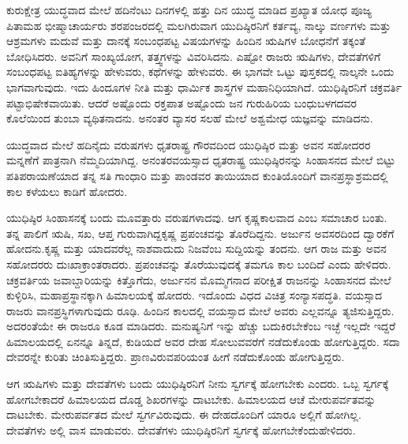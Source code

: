 \vskip 0.2cm

ಕುರುಕ್ಷೇತ್ರ ಯುದ್ಧವಾದ ಮೇಲೆ ಹದಿನೆಂಟು ದಿನಗಳಲ್ಲಿ ಹತ್ತು ದಿನ ಯುದ್ಧ ಮಾಡಿದ ಪ್ರಖ್ಯಾತ ಯೋಧ ಪೂಜ್ಯ ಪಿತಾಮಹ ಭೀಷ್ಮಾಚಾರ್ಯರು ಶರಪಂಜರದಲ್ಲಿ ಮಲಗಿರುವಾಗ ಯುದಿಷ್ಠಿರನಿಗೆ ಕರ್ತವ್ಯ, ನಾಲ್ಕು ವರ್ಣಗಳು ಮತ್ತು ಆಶ್ರಮಗಳು ಮದುವೆ ಮತ್ತು ದಾನಕ್ಕೆ ಸಂಬಂಧಪಟ್ಟ ವಿಷಯಗಳನ್ನು ಹಿಂದಿನ ಋಷಿಗಳ ಬೋಧನೆಗೆ ತಕ್ಕಂತೆ ಬೋಧಿಸಿದರು. ಅವನಿಗೆ ಸಾಂಖ್ಯಯೋಗ, ತತ್ತ್ವಗಳನ್ನು ವಿವರಿಸಿದನು. ಎಷ್ಟೋ ರಾಜರು ಋಷಿಗಳು, ದೇವತೆಗಳಿಗೆ ಸಂಬಂಧಪಟ್ಟ ಐತಿಹ್ಯಗಳನ್ನು ಹೇಳುವರು, ಕಥೆಗಳನ್ನು ಹೇಳುವರು. ಈ ಭಾಗವೇ ಒಟ್ಟು ಪುಸ್ತಕದಲ್ಲಿ ನಾಲ್ಕನೇ ಒಂದು ಭಾಗವಾಗುವುದು. ಇದು ಹಿಂದೂಗಳ ನೀತಿ ಮತ್ತು ಧಾರ್ಮಿಕ ಶಾಸ್ತ್ರಗಳ ಮಹಾನಿಧಿಯಾಗಿದೆ. ಯುಧಿಷ್ಠಿರನಿಗೆ ಚಕ್ರವರ್ತಿ ಪಟ್ಟಾಭಿಷೇಕವಾಯಿತು. ಆದರೆ ಅಷ್ಟೊಂದು ರಕ್ತಪಾತ ಅಷ್ಟೊಂದು ಜನ ಗುರುಹಿರಿಯ ಬಂಧುಬಳಗದವರ ಕೊಲೆಯಿಂದ ತುಂಬಾ ವ್ಯಥಿತನಾದನು. ಅನಂತರ ವ್ಯಾಸರ ಸಲಹೆ ಮೇಲೆ ಅಶ್ವಮೇಧ ಯಜ್ಞವನ್ನು ಮಾಡಿದನು.

\vskip 0.1cm

ಯುದ್ಧವಾದ ಮೇಲೆ ಹದಿನೈದು ವರುಷಗಳು ಧೃತರಾಷ್ಟ್ರ ಗೌರವದಿಂದ ಯುಧಿಷ್ಠಿರ ಮತ್ತು ಅವನ ಸಹೋದರರ ಮನ್ನಣೆಗೆ ಪಾತ್ರನಾಗಿ ನೆಮ್ಮದಿಯಾಗಿದ್ದ. ಅನಂತರ\break ವಯಸ್ಸಾದ ಧೃತರಾಷ್ಟ್ರ ಯುಧಿಷ್ಠಿರನನ್ನು ಸಿಂಹಾಸನದ ಮೇಲೆ ಬಿಟ್ಟು ಪತಿಪರಾಯಣೆಯಾದ ತನ್ನ ಸತಿ ಗಾಂಧಾರಿ ಮತ್ತು ಪಾಂಡವರ ತಾಯಿಯಾದ ಕುಂತಿಯೊಂದಿಗೆ ವಾನಪ್ರಸ್ಥಾಶ್ರಮದಲ್ಲಿ ಕಾಲ ಕಳೆಯಲು ಕಾಡಿಗೆ ಹೋದರು.

\vskip 0.1cm

ಯುಧಿಷ್ಠಿರ ಸಿಂಹಾಸನಕ್ಕೆ ಬಂದು ಮೂವತ್ತಾರು ವರುಷಗಳಾದವು. ಆಗ ಕೃಷ್ಣ\break ಕಾಲವಾದ ಎಂಬ ಸಮಾಚಾರ ಬಂತು. ತನ್ನ ಪಾಲಿಗೆ ಋಷಿ, ಸಖ, ಆಪ್ತ ಗುರುವಾಗಿದ್ದ\break ಕೃಷ್ಣ ಪ್ರಪಂಚವನ್ನು ತೊರೆದಿದ್ದನು. ಅರ್ಜುನ ಅವಸರದಿಂದ ದ್ವಾರಕೆಗೆ ಹೋದನು.\break ಕೃಷ್ಣ ಮತ್ತು ಯಾದವರೆಲ್ಲ ನಾಶವಾದುದು ನಿಜವೆಂಬ ಸುದ್ದಿಯನ್ನು ತಂದನು. ಆಗ ರಾಜ ಮತ್ತು ಅವನ ಸಹೋದರರು ದುಃಖಾಕ್ರಾಂತರಾದರು. ಪ್ರಪಂಚವನ್ನು ತೊರೆಯುವುದಕ್ಕೆ ತಮಗೂ ಕಾಲ ಬಂದಿದೆ ಎಂದು ಹೇಳಿದರು. ಚಕ್ರವರ್ತಿಯ ಜವಾಬ್ದಾರಿಯನ್ನು ಕಿತ್ತೊಗೆದು, ಅರ್ಜುನನ ಮೊಮ್ಮಗನಾದ ಪರೀಕ್ಷಿತ ರಾಜನನ್ನು ಸಿಂಹಾಸನದ ಮೇಲೆ ಕುಳ್ಳಿರಿಸಿ, ಮಹಾಪ್ರಸ್ಥಾನಕ್ಕಾಗಿ ಹಿಮಾಲಯಕ್ಕೆ ಹೋದರು. ಇದೊಂದು ವಿಧದ ವಿಚಿತ್ರ ಸಂನ್ಯಾಸಪದ್ಧತಿ. ವಯಸ್ಸಾದ ರಾಜರು ವಾನಪ್ರಸ್ಥಿಗಳಾಗುವುದು ರೂಢಿ. ಹಿಂದಿನ ಕಾಲದಲ್ಲಿ ವಯಸ್ಸಾದ ಮೇಲೆ ಅವರು ಎಲ್ಲವನ್ನೂ ತ್ಯಜಿಸುತ್ತಿದ್ದರು. ಅದರಂತೆಯೇ ಈ ರಾಜರೂ ಕೂಡ ಮಾಡಿದರು. ಮನುಷ್ಯನಿಗೆ ಇನ್ನು ಹೆಚ್ಚು ಬದುಕಿರಬೇಕೆಂಬ ಇಚ್ಛೆ ಇಲ್ಲದೇ ಇದ್ದರೆ ಹಿಮಾಲಯದಲ್ಲಿ ಏನನ್ನೂ ತಿನ್ನದೆ, ಕುಡಿಯದೆ ಅವರ ದೇಹ ಸೋಲುವವರೆಗೆ ನಡೆದುಕೊಂಡು ಹೋಗುತ್ತಿದ್ದರು. ಸದಾ ದೇವರನ್ನೇ ಕುರಿತು ಚಿಂತಿಸುತ್ತಿದ್ದರು. ಪ್ರಾಣವಿರುವ\break ಪರಿಯಂತ ಹೀಗೆ ನಡೆದುಕೊಂಡು ಹೋಗುತ್ತಿದ್ದರು.

\vskip 0.1cm

ಆಗ ಋಷಿಗಳು ಮತ್ತು ದೇವತೆಗಳು ಬಂದು ಯುಧಿಷ್ಠಿರನಿಗೆ ನೀನು ಸ್ವರ್ಗಕ್ಕೆ ಹೋಗಬೇಕು ಎಂದರು. ಒಬ್ಬ ಸ್ವರ್ಗಕ್ಕೆ ಹೋಗಬೇಕಾದರೆ ಹಿಮಾಲಯದ ದೊಡ್ಡ ಶಿಖರಗಳನ್ನು ದಾಟಬೇಕು. ಹಿಮಾಲಯದ ಆಚೆ ಮೇರುಪರ್ವತವನ್ನು ದಾಟಬೇಕು. ಮೇರುಪರ್ವತದ ಮೇಲೆ ಸ್ವರ್ಗವಿರುವುದು. ಈ ದೇಹದೊಂದಿಗೆ ಯಾರೂ ಅಲ್ಲಿಗೆ ಹೋಗಿಲ್ಲ. ದೇವತೆಗಳು ಅಲ್ಲಿ ವಾಸ ಮಾಡುವರು. ದೇವತೆಗಳು ಯುಧಿಷ್ಠಿರನಿಗೆ ಸ್ವರ್ಗಕ್ಕೆ ಹೋಗಬೇಕೆಂದು\break ಹೇಳಿದರು.

